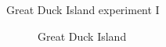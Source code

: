 \documentclass[presentation, bigger]{beamer}
\begin{document}
\begin{frame}[label=sec-1-4]{Great Duck Island experiment I}
  \centering
  \begin{figure}
    \caption{Great Duck Island}
  \end{figure}

\end{frame}
\end{document}
